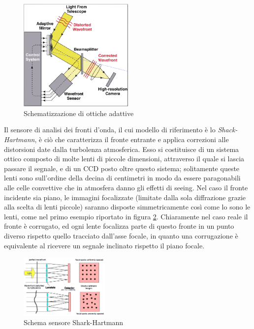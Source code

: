 \begin{figure}[h]
	\centering
	\includegraphics[width=0.5\textwidth]{Immagini/Capitolo2/ottiche_adattive.PNG}
	\caption{Schematizzazione di ottiche adattive}
	\label{im:ottiche-adattive}
    \vspace{-5pt}
\end{figure}

Il sensore di analisi dei fronti d'onda, il cui modello di riferimento è lo \textit{Shack-Hartmann}, è ciò che caratterizza il fronte entrante e applica correzioni alle distorsioni date dalla turbolenza atmosferica. Esso si costituisce di un sistema ottico composto di molte lenti di piccole dimensioni, attraverso il quale si lascia passare il segnale, e di un CCD posto oltre questo sistema; solitamente queste lenti sono sull'ordine della decina di centimetri in modo da essere paragonabili alle celle convettive che in atmosfera danno gli effetti di seeing. Nel caso il fronte incidente sia piano, le immagini focalizzate (limitate dalla sola diffrazione grazie alla scelta di lenti piccole) saranno disposte simmetricamente così come lo sono le lenti, come nel primo esempio riportato in figura \ref{im:sensore-Shack-Hartmann}. Chiaramente nel caso reale il fronte è corrugato, ed ogni lente focalizza parte di questo fronte in un punto diverso rispetto quello tracciato dall'asse focale, in quanto una corrugazione è equivalente al ricevere un segnale inclinato rispetto il piano focale.

\begin{figure}
	\centering
	\includegraphics[width=0.39\textwidth]{Immagini/Capitolo2/sensore_Shark_Hartmann.PNG}
	\caption{Schema sensore Shark-Hartmann}
	\label{im:sensore-Shack-Hartmann}
	\vspace{-10pt}
\end{figure}

